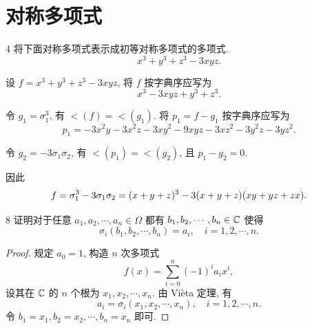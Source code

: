
\renewcommand{\thesection}{1.10}

\section{对称多项式}\label{sec:1.10}

\begin{ex}{4}\label{ex:1.10.4}
    将下面对称多项式表示成初等对称多项式的多项式.
    \[
    x^3+y^3+z^3-3xyz.
    \]
\end{ex}

\begin{solution}
    设 \(f=x^3+y^3+z^3-3xyz\), 将 \(f\) 按字典序应写为
    \[
    x^3-3xyz+y^3+z^3.
    \]

    令 \(g_1=\sigma_1^3\), 有 \(\lt(f)=\lt(g_1)\). 将 \(p_1=f-g_1\) 按字典序应写为
    \[
    p_1=-3x^2y-3x^2z-3xy^2-9xyz-3xz^2-3y^2z-3yz^2.
    \]

    令 \(g_2=-3\sigma_1\sigma_2\), 有 \(\lt(p_1)=\lt(g_2)\), 且 \(p_1-g_2=0\).

    因此
    \[
    f=\sigma_1^3-3\sigma_1\sigma_2=(x+y+z)^3-3(x+y+z)(xy+yz+zx).\qedhere
    \]
\end{solution}

\begin{ex}{8}\label{ex:1.10.8}
    证明对于任意 \(a_1,a_2,\cdots,a_n\in\Omega\) 都有 \(b_1,b_2,\cdots,b_n\in\mathbb{C}\) 使得
    \[
    \sigma_i(b_1,b_2,\cdots,b_n)=a_i,\quad i=1,2,\cdots,n.
    \]
\end{ex}

\begin{proof}
    规定 \(a_0=1\), 构造 \(n\) 次多项式
    \[
    f(x)=\sum_{i=0}^{n}(-1)^ia_ix^i,
    \]
    设其在 \(\mathbb{C}\) 的 \(n\) 个根为 \(x_1,x_2,\cdots,x_n\). 由 Vi\`eta 定理, 有
    \[
    a_i=\sigma_i(x_1,x_2,\cdots,x_n),\quad i=1,2,\cdots,n.
    \]
    令 \(b_1=x_1,b_2=x_2,\cdots,b_n=x_n\) 即可.
\end{proof}